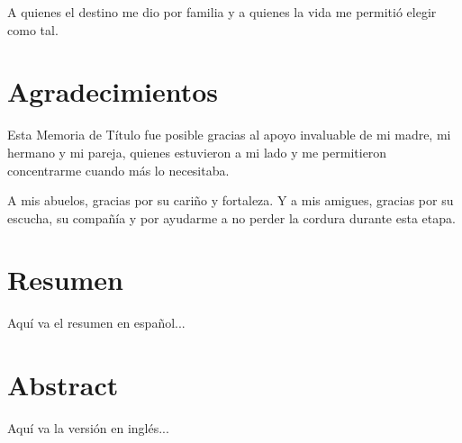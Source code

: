 \documentclass[12pt,twoside]{report}
\begin{document}
\clearpage
\onehalfspace
\vspace*{5cm}
\begin{flushright}
	A quienes el destino me dio por familia y a quienes la vida me permitió elegir como tal.
\end{flushright}

\chapter*{Agradecimientos}
\thispagestyle{empty}
Esta Memoria de Título fue posible gracias al apoyo invaluable de mi madre, mi hermano y mi pareja, quienes estuvieron a mi lado y me permitieron concentrarme cuando más lo necesitaba.

A mis abuelos, gracias por su cariño y fortaleza. Y a mis amigues, gracias por su escucha, su compañía y por ayudarme a no perder la cordura durante esta etapa.
\clearpage
\pagestyle{plain}
\chapter*{Resumen}
Aquí va el resumen en español...

\chapter*{Abstract}
Aquí va la versión en inglés...

\tableofcontents
\listoftables
\listoffigures

\clearpage
{}











\appendix
\renewcommand{\chaptertitlename}{Anexo}

\end{document}
